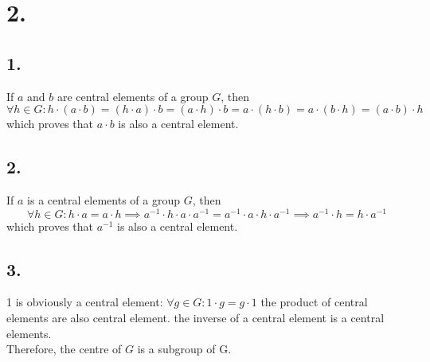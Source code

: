 \documentclass[11pt]{article}
\begin{document}
\section*{2.}
\subsection*{1.}
If $a$ and $b$ are central elements of a group $G$, then \\
\[
\forall h \in G: h \cdot (a \cdot b) = (h \cdot a) \cdot b = (a \cdot h ) \cdot b = a \cdot (h \cdot b) = a \cdot (b \cdot h) = (a \cdot b ) \cdot h
\]
which proves that $ a\cdot b$ is also a central element.
\subsection*{2.}
If $a$ is a central elements of a group $G$, then \\
\[
\forall h \in G: h \cdot a = a \cdot h \implies a^{-1} \cdot h \cdot a \cdot a^{-1} = a^{-1} \cdot a \cdot h \cdot a^{-1} \implies a^{-1} \cdot h = h \cdot a^{-1}
\]
which proves that $a^{-1}$ is also a central element. \\
\subsection*{3.}
1 is obviously a central element: $\forall g \in G: 1 \cdot g = g \cdot 1$
the product of central elements are also central element. 
the inverse of a central element is a central elements. \\
Therefore, the centre of $G$ is a subgroup of G. \\
\end{document}
